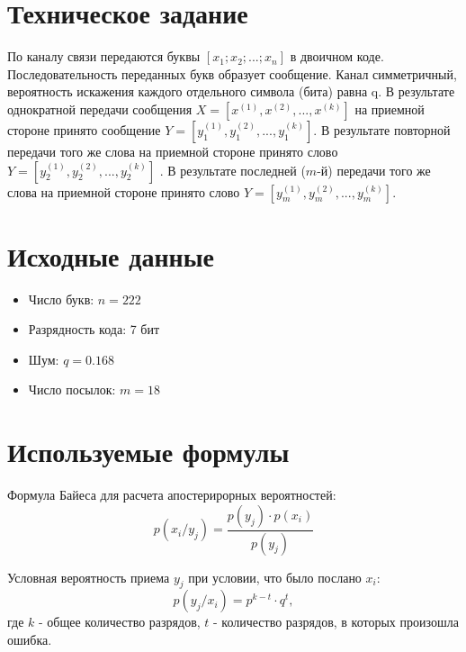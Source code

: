 

\usepackage{pgffor}





\section{Техническое задание}

По каналу связи передаются буквы $[x_1; x_2;...; x_n]$ в двоичном коде. Последовательность переданных букв образует сообщение. Канал симметричный, вероятность искажения каждого отдельного символа (бита) равна q. В результате однократной передачи сообщения $X = [x^{(1)}, x^{(2)}, ..., x^{(k)}]$ на приемной стороне принято сообщение $Y = [y_1^{(1)}, y_1^{(2)}, ..., y_1^{(k)}]$. В результате повторной передачи того же слова на приемной стороне принято слово $Y = [y_2^{(1)}, y_2^{(2)}, ..., y_2^{(k)}]$ . В результате последней ($m$-й) передачи того же слова на приемной стороне принято слово $Y = [y_m^{(1)}, y_m^{(2)}, ..., y_m^{(k)}]$.

\section{Исходные данные}

\begin{itemize}
\item Число букв: $n = 222$
\item Разрядность кода: 7 бит
\item Шум: $q = 0.168$
\item Число посылок: $m = 18$
\end{itemize}

\section{Используемые формулы}

Формула Байеса для расчета апостерирорных вероятностей:
\begin{equation}\label{eq:pxy}
	p(x_i/y_j) = \frac{p(y_j)\cdot p(x_i)}{p(y_j)}
\end{equation}

Условная вероятность приема $y_j$ при условии, что было послано $x_i$:
\begin{equation}\label{eq:pyx}
	p(y_j/x_i) = p^{k-t}\cdot q^t,
\end{equation}
где $k$ - общее количество разрядов, $t$ - количество разрядов, в которых произошла ошибка. 

